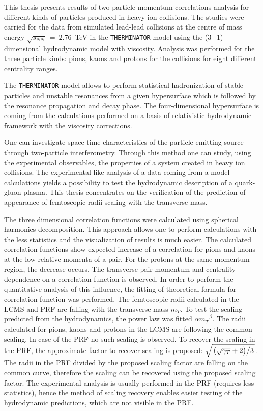 This thesis presents results of two-particle momentum correlations analysis for different kinds of particles produced in heavy ion collisions.
The studies were carried for the data from simulated lead-lead collisions at the centre of mass energy $\sqrt{s_{NN}}~=~2.76$~TeV in the \verb|THERMINATOR| model using the (3+1)-dimensional hydrodynamic model with viscosity.
Analysis was performed for the three particle kinds: pions, kaons and protons for the collisions for eight different centrality ranges.

The \verb|THERMINATOR| model allows to perform statistical hadronization of stable particles and unstable resonances from a given hypersurface which is followed by the resonance propagation and decay phase.
The four-dimensional hypersurface is coming from the calculations performed on a basis of relativistic hydrodynamic framework with the viscosity corrections.

One can investigate space-time characteristics of the particle-emitting source through two-particle interferometry.
Through this method one can study, using the experimental observables, the properties of a system created in heavy ion collisions.
The experimental-like analysis of a data coming from a model calculations yields a possibility to test the hydrodynamic description of a quark-gluon plasma.
This thesis concentrates on the verification of the prediction of appearance of femtoscopic radii scaling with the transverse mass.

The three dimensional correlation functions were calculated using spherical harmonics decomposition.
This approach allows one to perform calculations with the less statistics and the visualization of results is much easier.
The calculated correlation functions show expected increase of a correlation for pions and kaons at the low relative momenta of a pair.
For the protons at the same momentum region, the decrease occurs.
The transverse pair momentum and centrality dependence on a correlation function is observed.
In order to perform the quantitative analysis of this influence, the fitting of theoretical formula for correlation function was performed.
The femtoscopic radii calculated in the LCMS and PRF are falling with the transverse mass $m_T$.
To test the scaling predicted from the hydrodynamics, the power law was fitted $\alpha m_T^{-\beta}$.
The radii calculated for pions, kaons and protons in the LCMS are following the common scaling.
In case of the PRF no such scaling is observed.
To recover the scaling in the PRF, the approximate factor to recover scaling is proposed: $\sqrt{ \left. \left( \sqrt{\gamma_T} + 2 \right) \middle/ 3 \right. }$.
The radii in the PRF divided by the proposed scaling factor are falling on the common curve, therefore the scaling can be recovered using the proposed scaling factor.
The experimental analysis is usually performed in the PRF (requires less statistics), hence the method of scaling recovery enables easier testing of the hydrodynamic predictions, which are not visible in the PRF.
